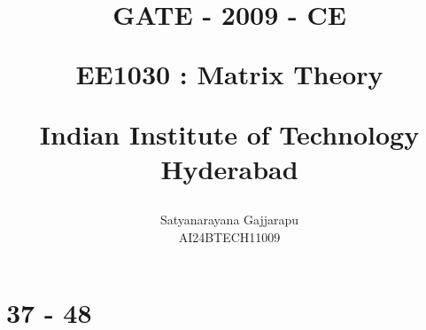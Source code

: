 \documentclass[journal]{IEEEtran}
\begin{document}

\vspace{3cm}




\title{
GATE - 2009 - CE

\large{EE1030 : Matrix Theory}

Indian Institute of Technology Hyderabad
}
\author{Satyanarayana Gajjarapu

AI24BTECH11009
}	





\maketitle




\bigskip

\renewcommand{\thefigure}{\theenumi}
\renewcommand{\thetable}{\theenumi}


\section{37 - 48}
\end{document}
